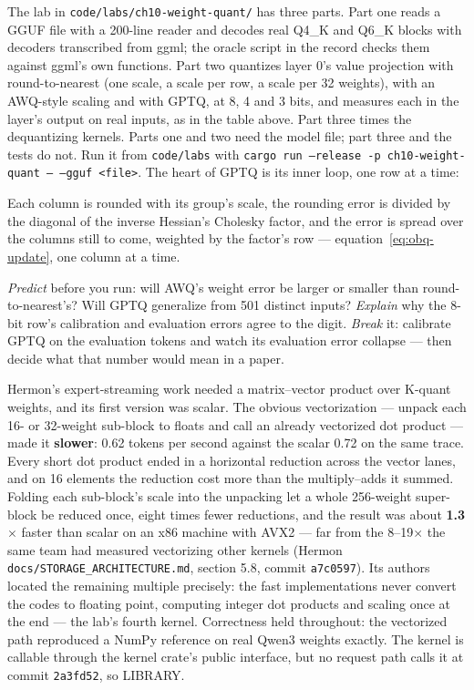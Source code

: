 
The lab in \texttt{code/labs/ch10-weight-quant/} has three parts. Part one reads
a GGUF file with a 200-line reader and decodes real Q4\_K and Q6\_K blocks with
decoders transcribed from ggml; the oracle script in the record checks them
against ggml's own functions. Part two quantizes layer 0's value projection with
round-to-nearest (one scale, a scale per row, a scale per 32 weights), with an
AWQ-style scaling and with GPTQ, at 8, 4 and 3 bits, and measures each in the
layer's output on real inputs, as in the table above. Part three times the
dequantizing kernels. Parts one and two need the model file; part three and the
tests do not. Run it from \texttt{code/labs} with
\texttt{cargo run --release -p ch10-weight-quant -- --gguf <file>}. The heart of
GPTQ is its inner loop, one row at a time:


\noindent Each column is rounded with its group's scale, the rounding error is
divided by the diagonal of the inverse Hessian's Cholesky factor, and the error
is spread over the columns still to come, weighted by the factor's row ---
equation~\eqref{eq:obq-update}, one column at a time.

\emph{Predict} before you run: will AWQ's weight error be larger or smaller than
round-to-nearest's? Will GPTQ generalize from 501 distinct inputs? \emph{Explain}
why the 8-bit row's calibration and evaluation errors agree to the digit.
\emph{Break} it: calibrate GPTQ on the evaluation tokens and watch its evaluation
error collapse --- then decide what that number would mean in a paper.


Hermon's expert-streaming work needed a matrix--vector product over K-quant
weights, and its first version was scalar. The obvious vectorization ---
unpack each 16- or 32-weight sub-block to floats and call an already
vectorized dot product --- made it \textbf{slower}: 0.62 tokens per second
against the scalar 0.72 on the same trace. Every short dot product ended in a
horizontal reduction across the vector lanes, and on 16 elements the reduction
cost more than the multiply--adds it summed. Folding each sub-block's scale into
the unpacking let a whole 256-weight super-block be reduced once, eight times
fewer reductions, and the result was about \textbf{1.3$\times$} faster than
scalar on an x86 machine with AVX2 --- far from the 8--19$\times$ the same
team had measured vectorizing other kernels (Hermon
\texttt{docs/STORAGE\_ARCHITECTURE.md}, section 5.8, commit \texttt{a7c0597}).
Its authors located the remaining multiple precisely: the fast implementations
never convert the codes to floating point, computing integer dot products and
scaling once at the end --- the lab's fourth kernel. Correctness held
throughout: the vectorized path reproduced a NumPy reference on real Qwen3
weights exactly. The kernel is callable through the kernel crate's public
interface, but no request path calls it at commit \texttt{2a3fd52}, so LIBRARY.

